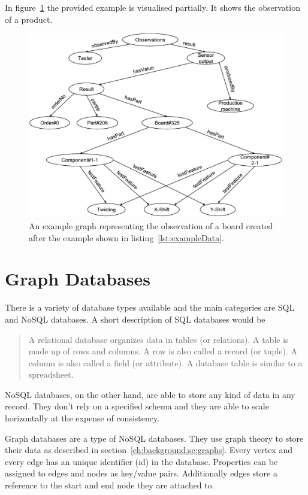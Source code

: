 In figure~\ref{fig:exampleData} the provided example is visualised partially.
It shows the observation of a product.

\begin{figure}
  \centering
  \includegraphics[width=\textwidth]{images/design/exampleGraph}
  \caption{An example graph representing the observation of a board created after the example shown in listing~\ref{lst:exampleData}.}
  \label{fig:exampleData}
\end{figure}

\section{Graph Databases}
\label{ch:background:se:graphDatabases}
There is a variety of database types available and the main categories are SQL and NoSQL databases.
A short description of SQL databases would be
\blockquote[\cite{ChuaHock-Chuan}]{A relational database organizes data in tables (or relations).
A table is made up of rows and columns.
A row is also called a record (or tuple).
A column is also called a field (or attribute).
A database table is similar to a spreadsheet.}

NoSQL databases,
on the other hand,
are able to store any kind of data in any record.
They don't rely on a specified schema and they are able to scale horizontally at the expense of consistency.~\cite{Yegulalp2017}

Graph databases are a type of NoSQL databases.
They use graph theory to store their data as described in section~\ref{ch:background:se:graphs}.
Every vertex and every edge has an unique identifier (id) in the database.
Properties can be assigned to edges and nodes as key/value pairs.
Additionally edges store a reference to the start and end node they are attached to.~\cite{Rouse2016}

